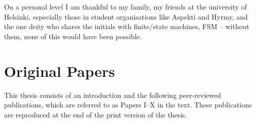 \documentclass[officiallayout,final]{unihelcompling}
\begin{document}
On a personal level I am thankful to my family, my friends at the university of
Helsinki, especially those in student organisations like Aspekti and Hyrmy, and
the one deity who shares the initials with finite\-/state machines,
FSM -- without them, none of this would have been possible.

\chapter*{Original Papers}
\label{chap:papers}

This thesis consists of an introduction and the following peer-reviewed
publications, which are referred to as Papers I–X in the text. These
publications are reproduced at the end of the print version of the thesis.

\end{document}
